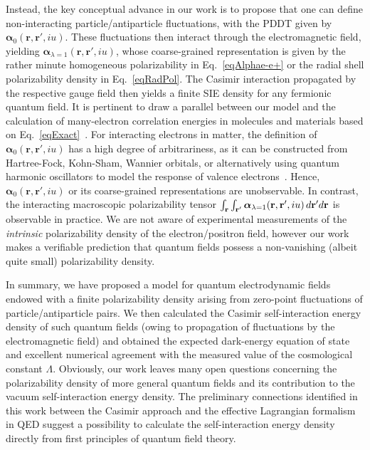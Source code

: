 \documentclass[aps,prl,twocolumn,showpacs,groupaddress]{revtex4-1}
\newcommand{\rrr}[1]{{\color{black}#1}}
\newcommand{\bbb}[1]{{\color{black}#1}}
\begin{document}
Instead, the key conceptual advance in our work is to propose that one can define non-interacting particle/antiparticle fluctuations, with the PDDT given by
${\bm{\alpha}}_0(\mathbf{r},\mathbf{r}',iu)$. These fluctuations then interact through the electromagnetic field, yielding ${\bm{\alpha}}_{\lambda=1}(\mathbf{r},\mathbf{r}',iu)$, whose coarse-grained representation is given by the rather minute homogeneous polarizability in Eq.~\eqref{eqAlphae-e+} or the radial shell polarizability density in Eq.~\eqref{eqRadPol}. The Casimir interaction propagated by the respective gauge field then yields a finite SIE density for any fermionic quantum field. It is pertinent to draw a parallel between our model
and the calculation of many-electron correlation energies
in molecules and materials based on Eq.~\eqref{eqExact}~\cite{Dobson,Kresse,Xinguo-RPA}. 
For interacting electrons in matter, the definition of ${\bm{\alpha}}_0(\mathbf{r},\mathbf{r}',iu)$ has a high degree of arbitrariness, as it can be constructed from Hartree-Fock, Kohn-Sham, Wannier orbitals, or alternatively using quantum harmonic oscillators to model the response of valence electrons~\cite{Jan-ChemRev,Woods-RMP}. 
Hence, ${\bm{\alpha}}_0(\mathbf{r},\mathbf{r}',iu)$ or its coarse-grained representations are unobservable. In contrast, the interacting macroscopic polarizability tensor \bbb{$\int_{\bf r} \int_{{\bf r}'} {\bm{\alpha}}_{\lambda=1}(\mathbf{r},\mathbf{r}',iu)\, d{{\bf r}'} d{\bf r}$} is observable in practice. We are not aware of
experimental measurements of the \textit{intrinsic} polarizability density of the electron/positron field, however our work makes a verifiable prediction that quantum fields possess a non-vanishing (albeit quite small) polarizability density.       

In summary, we have proposed a model for quantum electrodynamic fields endowed with a finite polarizability density arising from zero-point fluctuations of particle/antiparticle pairs. We then calculated the Casimir self-interaction energy density of such quantum fields (owing to propagation of fluctuations by the electromagnetic field) and obtained the expected dark-energy equation of state and excellent numerical agreement with the measured value of the cosmological constant $\Lambda$. 
Obviously, our work leaves many open questions concerning the polarizability density
of more general quantum fields and its contribution to the vacuum self-interaction energy density. \rrr{The preliminary connections identified in this work between the Casimir approach and the effective Lagrangian formalism in QED suggest a possibility to calculate the self-interaction energy density directly from first principles of quantum field theory.}
\end{document}
